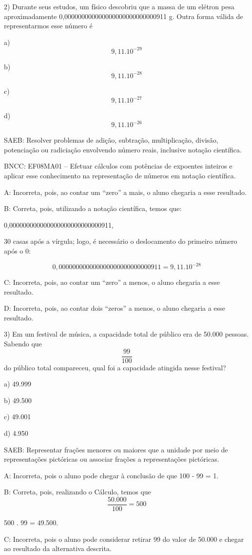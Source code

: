 2) Durante seus estudos, um físico descobriu que a massa de um elétron
pesa aproximadamente 0,000000000000000000000000000911 g. Outra forma
válida de representarmos esse número é

a) \[9,11 . 10^{-29}\]

b) \[9,11 . 10^{-28}\]

c) \[ 9,11 . 10^{-27}\]

d) \[9,11 . 10^{-26}\]

SAEB: Resolver problemas de adição, subtração, multiplicação, divisão,
potenciação ou radiciação envolvendo número reais, inclusive notação
científica.

BNCC: EF08MA01 -- Efetuar cálculos com potências de expoentes inteiros e
aplicar esse conhecimento na representação de números em notação
científica.

A: Incorreta, pois, ao contar um ``zero'' a mais, o aluno chegaria a
esse resultado.

B: Correta, pois, utilizando a notação científica, temos que:

0,000000000000000000000000000911,

30 casas após a vírgula; logo, é necessário o deslocamento do primeiro
número após o 0:

\[0,000000000000000000000000000911 = 9,11 . 10^{-28}\]

C: Incorreta, pois, ao contar um ``zero'' a menos, o aluno chegaria a
esse resultado.

D: Incorreta, pois, ao contar dois ``zeros'' a menos, o aluno chegaria a
esse resultado.

3) Em um festival de música, a capacidade total de público era de 50.000
pessoas. Sabendo que \[\frac{99}{100}\] do público total compareceu,
qual foi a capacidade atingida nesse festival?

a) 49.999

b) 49.500

c) 49.001

d) 4.950

SAEB: Representar frações menores ou maiores que a unidade por meio de
representações pictóricas ou associar frações a representações
pictóricas.

A: Incorreta, pois o aluno pode chegar à conclusão de que 100 - 99 = 1.

B: Correta, pois, realizando o Cálculo, temos que
\[ \frac {50.000} {100} = 500\]

500 . 99 = 49.500.

C: Incorreta, pois o aluno pode considerar retirar 99 do valor de 50.000
e chegar ao resultado da alternativa descrita.

